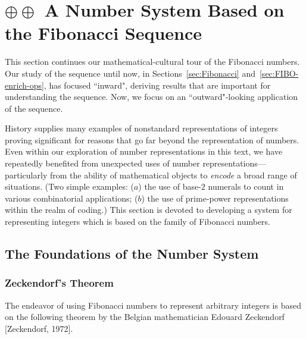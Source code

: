 \section{$\oplus \oplus$ A Number System Based on the Fibonacci Sequence}
\label{sec:numerals-special-families}
\label{sec:Fibo-numbers}

\label{sec:FIBO-num-intro}

This section continues our mathematical-cultural tour of the Fibonacci numbers.  Our study of the sequence until now, in Sections~\ref{sec:Fibonacci} and~\ref{sec:FIBO-enrich-ops}, has focused ``inward", deriving results that are important for understanding the sequence.  Now, we focus on an ``outward"-looking application of the sequence.

\medskip

History supplies many examples of nonstandard representations of integers proving significant for reasons that go far beyond the representation of numbers.  Even within our exploration of number representations in this text, we have repeatedly benefited from unexpected uses of number representations---particularly from the ability of mathematical objects to {\em encode} a broad range of situations.  (Two simple examples: ($a$) the use of base-$2$ numerals to count in various combinatorial applications; ($b$) the use of prime-power representations within the realm of coding.)  This section is devoted to developing a system for representing integers which is based on the family of Fibonacci numbers.

\subsection{The Foundations of the Number System}

\subsubsection{Zeckendorf's Theorem}
\label{sec:Zeckendorf's-Theorem}

 

The endeavor of using Fibonacci numbers to represent arbitrary integers is based on the following theorem by the Belgian mathematician Edouard Zeckendorf  [Zeckendorf, 1972].

